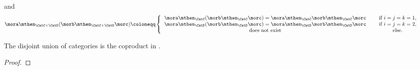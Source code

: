 {\begin{solution}
\begin{equation}
	\end{equation}
	and
	\begin{equation}
		\mora \mthen_{\CatC+\CatD} (\morb\mthen_{\CatC+\CatD} \morc) \coloneqq
	\left\{
	\begin{tabular}{ccc}
	$\mora\mthen_\CatC (\morb\mthen_\CatC \morc)= \mora\mthen_\CatC \morb\mthen_\CatC \morc$ & & if $i=j =k =1$, \\
	$\mora\mthen_\CatD (\morb\mthen_\CatD \morc)= \mora\mthen_\CatD \morb\mthen_\CatD \morc$ & & if $i = j=k =2$, \\
	does not exist	& & else.
	\end{tabular}
	\right.
	\end{equation}
\end{solution}

\begin{lemma}
	The disjoint union of categories is the coproduct in \Category.
\end{lemma}

\begin{proof}
\end{proof}

}



